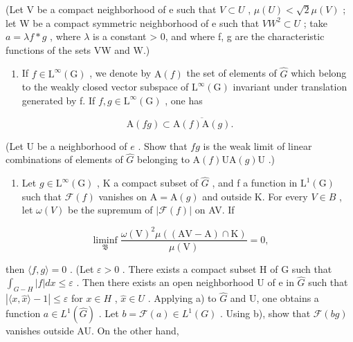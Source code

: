 (Let V be a compact neighborhood of e such that \(V \subset U\) , \(\mu(U) < \sqrt{2}\mu(V)\) ; let W be a compact symmetric neighborhood of e such that \(VW^{2} \subset U\) ; take \(a = \lambda f * g\) , where \(\lambda\) is a constant \textgreater{} 0, and where f, g are the characteristic functions of the sets VW and W.)

\begin{enumerate}
\def\labelenumi{\alph{enumi})}
\setcounter{enumi}{1}
\tightlist
\item
  If \(f \in \mathrm{L}^{\infty}(\mathrm{G})\) , we denote by \(\mathrm{A}(f)\) the set of elements of \(\widehat{G}\) which belong to the weakly closed vector subspace of \(\mathrm{L}^{\infty}(\mathrm{G})\) invariant under translation generated by f. If \(f, g \in \mathrm{L}^{\infty}(\mathrm{G})\) , one has
\end{enumerate}

\[
\mathrm{A} (f g) \subset \overline {{\mathrm{A} (f) \mathrm{A} (g)}}.
\]

(Let U be a neighborhood of \(e\) . Show that \(fg\) is the weak limit of linear combinations of elements of \(\widehat{G}\) belonging to \(\mathrm{A}(f)\mathrm{UA}(g)\mathrm{U}\) .)

\begin{enumerate}
\def\labelenumi{\alph{enumi})}
\setcounter{enumi}{2}
\tightlist
\item
  Let \(g \in \mathrm{L}^{\infty}(\mathrm{G})\) , K a compact subset of \(\widehat{G}\) , and f a function in \(\mathrm{L}^{1}(\mathrm{G})\) such that \(\mathcal{F}(f)\) vanishes on \(\mathrm{A} = \mathrm{A}(g)\) and outside K. For every \(V \in B\) , let \(\omega(V)\) be the supremum of \(|\mathcal{F}(f)|\) on AV. If
\end{enumerate}

\[
\operatorname * {l i m i n f} _ {\mathfrak {B}} \frac {\omega (\mathrm{V}) ^ {2} \mu ((\mathrm{AV} - \mathrm{A}) \cap \mathrm{K})}{\mu (\mathrm{V})} = 0,
\]

then \(\langle f,g\rangle=0\) . (Let \(\varepsilon>0\) . There exists a compact subset H of G such that \(\int_{G-H}|f|dx\leqslant\varepsilon\) . Then there exists an open neighborhood U of e in \(\widehat{G}\) such that \(|\langle x,\widehat{x}\rangle-1|\leqslant\varepsilon\) for \(x\in H\) , \(\widehat{x}\in U\) . Applying a) to \(\widehat{G}\) and U, one obtains a function \(a\in L^{1}(\widehat{G})\) . Let \(b=\mathcal{F}(a)\in L^{1}(G)\) . Using b), show that \(\mathcal{F}(bg)\) vanishes outside AU. On the other hand,


